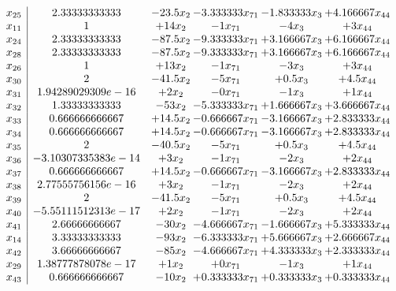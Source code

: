 \documentclass[11pt]{article}
\begin{document}
\[\begin{array}{c| c c@{\hskip 2pt} c@{\hskip 2pt} c@{\hskip 2pt} c@{\hskip 2pt} }
 x_{25}   &  2.33333333333 & -23.5 x_{2} & -3.333333 x_{71} & -1.833333 x_{3} & + 4.166667 x_{44}\\
 x_{11}   &  1 & + 14 x_{2} & -1 x_{71} & -4 x_{3} & + 3 x_{44}\\
 x_{24}   &  2.33333333333 & -87.5 x_{2} & -9.333333 x_{71} & + 3.166667 x_{3} & + 6.166667 x_{44}\\
 x_{28}   &  2.33333333333 & -87.5 x_{2} & -9.333333 x_{71} & + 3.166667 x_{3} & + 6.166667 x_{44}\\
 x_{26}   &  1 & + 13 x_{2} & -1 x_{71} & -3 x_{3} & + 3 x_{44}\\
 x_{30}   &  2 & -41.5 x_{2} & -5 x_{71} & + 0.5 x_{3} & + 4.5 x_{44}\\
 x_{31}   &  1.94289029309e-16 & + 2 x_{2} & -0 x_{71} & -1 x_{3} & + 1 x_{44}\\
 x_{32}   &  1.33333333333 & -53 x_{2} & -5.333333 x_{71} & + 1.666667 x_{3} & + 3.666667 x_{44}\\
 x_{33}   &  0.666666666667 & + 14.5 x_{2} & -0.666667 x_{71} & -3.166667 x_{3} & + 2.833333 x_{44}\\
 x_{34}   &  0.666666666667 & + 14.5 x_{2} & -0.666667 x_{71} & -3.166667 x_{3} & + 2.833333 x_{44}\\
 x_{35}   &  2 & -40.5 x_{2} & -5 x_{71} & + 0.5 x_{3} & + 4.5 x_{44}\\
 x_{36}   &  -3.10307335383e-14 & + 3 x_{2} & -1 x_{71} & -2 x_{3} & + 2 x_{44}\\
 x_{37}   &  0.666666666667 & + 14.5 x_{2} & -0.666667 x_{71} & -3.166667 x_{3} & + 2.833333 x_{44}\\
 x_{38}   &  2.77555756156e-16 & + 3 x_{2} & -1 x_{71} & -2 x_{3} & + 2 x_{44}\\
 x_{39}   &  2 & -41.5 x_{2} & -5 x_{71} & + 0.5 x_{3} & + 4.5 x_{44}\\
 x_{40}   &  -5.55111512313e-17 & + 2 x_{2} & -1 x_{71} & -2 x_{3} & + 2 x_{44}\\
 x_{41}   &  2.66666666667 & -30 x_{2} & -4.666667 x_{71} & -1.666667 x_{3} & + 5.333333 x_{44}\\
 x_{14}   &  3.33333333333 & -93 x_{2} & -6.333333 x_{71} & + 5.666667 x_{3} & + 2.666667 x_{44}\\
 x_{42}   &  3.66666666667 & -85 x_{2} & -4.666667 x_{71} & + 4.333333 x_{3} & + 2.333333 x_{44}\\
 x_{29}   &  1.38777878078e-17 & + 1 x_{2} & + 0 x_{71} & -1 x_{3} & + 1 x_{44}\\
 x_{43}   &  0.666666666667 & -10 x_{2} & + 0.333333 x_{71} & + 0.333333 x_{3} & + 0.333333 x_{44}\\

\end{array}\]
\end{document}
